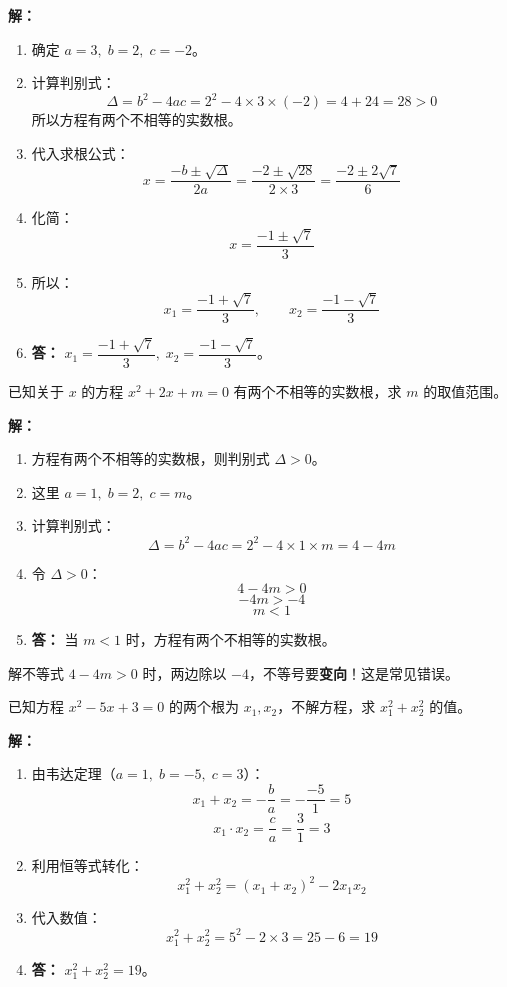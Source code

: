 \documentclass[12pt, a4paper]{ctexart}
\begin{document}
\textbf{解：}
\begin{enumerate}[leftmargin=2em]
  \item 确定 $a = 3,\; b = 2,\; c = -2$。
  \item 计算判别式：
  \[
  \Delta = b^2 - 4ac = 2^2 - 4 \times 3 \times (-2) = 4 + 24 = 28 > 0
  \]
  所以方程有两个不相等的实数根。
  \item 代入求根公式：
  \[
  x = \frac{-b \pm \sqrt{\Delta}}{2a} = \frac{-2 \pm \sqrt{28}}{2 \times 3} = \frac{-2 \pm 2\sqrt{7}}{6}
  \]
  \item 化简：
  \[
  x = \frac{-1 \pm \sqrt{7}}{3}
  \]
  \item 所以：
  \[
  x_1 = \frac{-1 + \sqrt{7}}{3}, \qquad x_2 = \frac{-1 - \sqrt{7}}{3}
  \]
  \item \textbf{答：} $x_1 = \dfrac{-1 + \sqrt{7}}{3},\; x_2 = \dfrac{-1 - \sqrt{7}}{3}$。
\end{enumerate}

\begin{examplebox}[【例题 4】判别式的应用]
已知关于 $x$ 的方程 $x^2 + 2x + m = 0$ 有两个不相等的实数根，求 $m$ 的取值范围。
\end{examplebox}

\textbf{解：}
\begin{enumerate}[leftmargin=2em]
  \item 方程有两个不相等的实数根，则判别式 $\Delta > 0$。
  \item 这里 $a = 1,\; b = 2,\; c = m$。
  \item 计算判别式：
  \[
  \Delta = b^2 - 4ac = 2^2 - 4 \times 1 \times m = 4 - 4m
  \]
  \item 令 $\Delta > 0$：
  \[
  4 - 4m > 0
  \]
  \[
  -4m > -4
  \]
  \[
  m < 1
  \]
  \item \textbf{答：} 当 $m < 1$ 时，方程有两个不相等的实数根。
\end{enumerate}

\begin{warnbox}[易错提醒]
解不等式 $4 - 4m > 0$ 时，两边除以 $-4$，不等号要\textbf{变向}！这是常见错误。
\end{warnbox}

\begin{examplebox}[【例题 5】韦达定理应用]
已知方程 $x^2 - 5x + 3 = 0$ 的两个根为 $x_1, x_2$，不解方程，求 $x_1^2 + x_2^2$ 的值。
\end{examplebox}

\textbf{解：}
\begin{enumerate}[leftmargin=2em]
  \item 由韦达定理（$a = 1,\; b = -5,\; c = 3$）：
  \[
  x_1 + x_2 = -\frac{b}{a} = -\frac{-5}{1} = 5
  \]
  \[
  x_1 \cdot x_2 = \frac{c}{a} = \frac{3}{1} = 3
  \]
  \item 利用恒等式转化：
  \[
  x_1^2 + x_2^2 = (x_1 + x_2)^2 - 2x_1 x_2
  \]
  \item 代入数值：
  \[
  x_1^2 + x_2^2 = 5^2 - 2 \times 3 = 25 - 6 = 19
  \]
  \item \textbf{答：} $x_1^2 + x_2^2 = 19$。
\end{enumerate}
\end{document}
